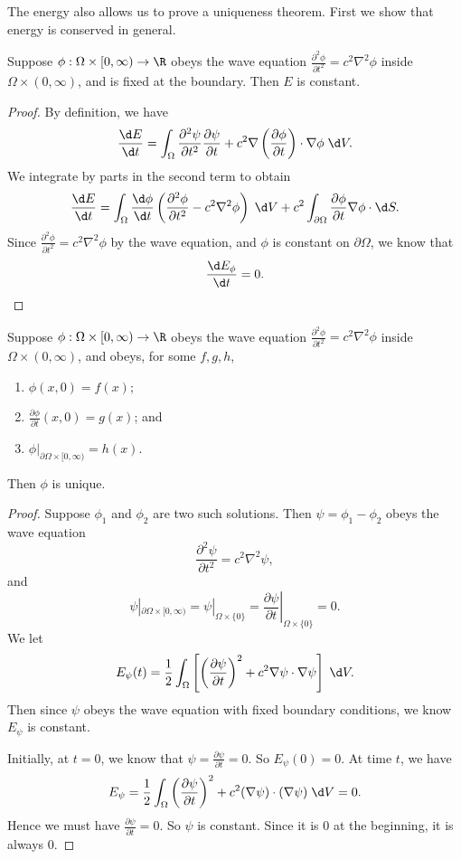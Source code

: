 \documentclass[a4paper]{article}
\begin{document}
The energy also allows us to prove a uniqueness theorem. First we show that energy is conserved in general.

\begin{prop}
  Suppose $\phi: \Omega \times [0, \infty) \to \R$ obeys the wave equation $\frac{\partial^2 \phi}{\partial t^2} = c^2 \nabla^2 \phi$ inside $\Omega \times (0, \infty)$, and is fixed at the boundary. Then $E$ is constant.
\end{prop}

\begin{proof}
  By definition, we have
  \[
    \frac{\d E}{\d t} = \int_\Omega \frac{\partial^2 \psi}{\partial t^2}\frac{\partial \psi}{\partial t} + c^2 \nabla \left(\frac{\partial \phi}{\partial t}\right)\cdot \nabla \phi \;\d V.
  \]
  We integrate by parts in the second term to obtain
  \[
    \frac{\d E}{\d t} = \int_\Omega \frac{\d \phi}{\d t}\left(\frac{\partial^2 \phi}{\partial t^2} - c^2 \nabla^2 \phi\right)\;\d V + c^2 \int_{\partial \Omega} \frac{\partial \phi}{\partial t}\nabla \phi \cdot \d S.
  \]
  Since $\frac{\partial^2 \phi}{\partial t^2} = c^2 \nabla^2 \phi$ by the wave equation, and $\phi$ is constant on $\partial \Omega$, we know that
  \[
    \frac{\d E_\phi}{\d t} = 0.\qedhere
  \]
\end{proof}

\begin{prop}
  Suppose $\phi: \Omega \times [0, \infty) \to \R$ obeys the wave equation $\frac{\partial^2 \phi}{\partial t^2} = c^2 \nabla^2 \phi$ inside $\Omega \times (0, \infty)$, and obeys, for some $f, g, h$,
  \begin{enumerate}
    \item $\phi(x, 0) = f(x)$;
    \item $\frac{\partial \phi}{\partial t}(x, 0) = g(x)$; and
    \item $\phi|_{\partial \Omega\times [0, \infty)} = h(x)$.
  \end{enumerate}
  Then $\phi$ is unique.
\end{prop}
\begin{proof}
  Suppose $\phi_1$ and $\phi_2$ are two such solutions. Then $\psi = \phi_1 - \phi_2$ obeys the wave equation
  \[
    \frac{\partial^2 \psi}{\partial t^2} = c^2 \nabla^2 \psi,
  \]
  and
  \[
    \psi|_{\partial \Omega \times [0, \infty)} = \psi|_{\Omega \times \{0\}} = \left.\frac{\partial \psi}{\partial t}\right|_{\Omega \times \{0\}} = 0.
  \]
  We let
  \[
    E_\psi(t) = \frac{1}{2}\int_\Omega \left[\left(\frac{\partial \psi}{\partial t}\right)^2 + c^2 \nabla \psi \cdot \nabla \psi\right] \;\d V.
  \]
  Then since $\psi$ obeys the wave equation with fixed boundary conditions, we know $E_\psi$ is constant.

  Initially, at $t = 0$, we know that $\psi = \frac{\partial \psi}{\partial t} = 0$. So $E_\psi(0) = 0$. At time $t$, we have
  \[
    E_\psi = \frac{1}{2}\int_\Omega \left(\frac{\partial \psi}{\partial t}\right)^2 + c^2 (\nabla \psi)\cdot (\nabla \psi) \;\d V = 0.
  \]
  Hence we must have $\frac{\partial \psi}{\partial t} = 0$. So $\psi$ is constant. Since it is $0$ at the beginning, it is always $0$.
\end{proof}
\end{document}
